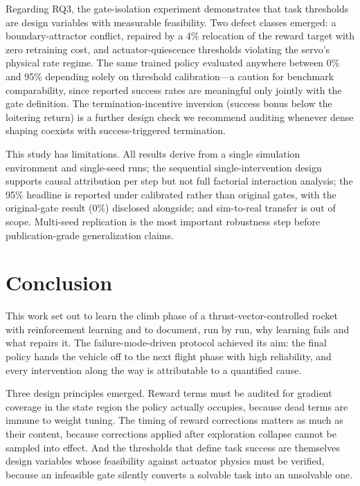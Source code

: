\documentclass[11pt,a4paper]{article}
\begin{document}
Regarding RQ3, the gate-isolation experiment demonstrates that task thresholds are design variables with measurable feasibility. Two defect classes emerged: a boundary-attractor conflict, repaired by a 4\% relocation of the reward target with zero retraining cost, and actuator-quiescence thresholds violating the servo's physical rate regime. The same trained policy evaluated anywhere between 0\% and 95\% depending solely on threshold calibration---a caution for benchmark comparability, since reported success rates are meaningful only jointly with the gate definition. The termination-incentive inversion (success bonus below the loitering return) is a further design check we recommend auditing whenever dense shaping coexists with success-triggered termination.

This study has limitations. All results derive from a single simulation environment and single-seed runs; the sequential single-intervention design supports causal attribution per step but not full factorial interaction analysis; the 95\% headline is reported under calibrated rather than original gates, with the original-gate result (0\%) disclosed alongside; and sim-to-real transfer is out of scope. Multi-seed replication is the most important robustness step before publication-grade generalization claims.


\section{Conclusion}

This work set out to learn the climb phase of a thrust-vector-controlled rocket with reinforcement learning and to document, run by run, why learning fails and what repairs it. The failure-mode-driven protocol achieved its aim: the final policy hands the vehicle off to the next flight phase with high reliability, and every intervention along the way is attributable to a quantified cause.

Three design principles emerged. Reward terms must be audited for gradient coverage in the state region the policy actually occupies, because dead terms are immune to weight tuning. The timing of reward corrections matters as much as their content, because corrections applied after exploration collapse cannot be sampled into effect. And the thresholds that define task success are themselves design variables whose feasibility against actuator physics must be verified, because an infeasible gate silently converts a solvable task into an unsolvable one.
\end{document}
